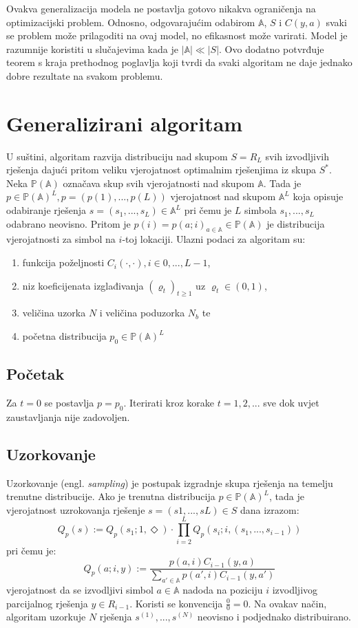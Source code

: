 \documentclass[times, utf8, zavrsni]{fer}
\begin{document}
Ovakva generalizacija modela ne postavlja gotovo nikakva ograničenja na optimizacijski problem. Odnosno, odgovarajućim odabirom
$\mathbb{A}$, $S$ i $C(y, a)$ svaki se problem može prilagoditi na ovaj model, no efikasnost može varirati. Model je razumnije koristiti u slučajevima kada je $|\mathbb{A}| \ll |S|$. Ovo dodatno potvrđuje teorem s kraja prethodnog poglavlja koji tvrdi da svaki algoritam ne daje jednako dobre rezultate na svakom problemu.



\section{Generalizirani algoritam}
U suštini, algoritam razvija distribuciju nad skupom $S=R_L$ svih izvodljivih rješenja dajući pritom veliku vjerojatnost optimalnim rješenjima iz skupa $S^*$.
Neka $\mathbb{P}(\mathbb{A})$ označava skup svih vjerojatnosti nad skupom $\mathbb{A}$. Tada je $p \in \mathbb{P}(\mathbb{A})^L, p = (p(1), . . . , p(L))$ vjerojatnost nad skupom $\mathbb{A}^L$ koja opisuje odabiranje rješenja
$s = (s_1,...,s_L) \in \mathbb{A}^L$ pri čemu je $L$ simbola $s_1,...,s_L$ odabrano neovisno. Pritom je
$p(i) = p(a;i)_{a \in \mathbb{A}} \in \mathbb{P}(\mathbb{A})$ je distribucija vjerojatnosti za simbol na $i$-toj lokaciji.
Ulazni podaci za algoritam su:
\begin{enumerate}
  \item funkcija poželjnosti $C_i(\cdot, \cdot), i \in {0,..., L-1}$,
  \item niz koeficijenata izglađivanja $(\varrho_t)_{t \geq 1}$ uz $\varrho_t \in (0, 1)$,
  \item veličina uzorka $N$ i veličina poduzorka $N_b$ te
  \item početna distribucija $p_0 \in \mathbb{P}(\mathbb{A})^L$
\end{enumerate}

\subsection{Početak}
Za $t = 0$ se postavlja $p = p_0$. Iterirati kroz korake $t = 1, 2,...$ sve dok uvjet zaustavljanja nije zadovoljen.

\subsection{Uzorkovanje}
Uzorkovanje (engl. \textit{sampling}) je postupak izgradnje skupa rješenja na temelju trenutne distribucije.
Ako je trenutna distribucija $p \in \mathbb{P}(\mathbb{A})^L$, tada je vjerojatnost uzrokovanja rješenje $s = (s1,...,sL) \in S$ dana izrazom:
$$
Q_p(s) := Q_p(s_1; 1, \Diamond) \cdot \prod^L_{i=2} Q_p(s_i;i, (s_1,...,s_{i-1}))
$$
pri čemu je:
$$
Q_p(a;i, y) := \frac{p(a, i)C_{i-1}(y, a)}{\sum_{a' \in \mathbb{A}} p(a', i)C_{i-1}(y, a') }
$$
vjerojatnost da se izvodljivi simbol $a \in \mathbb{A}$ nadoda na poziciju $i$ izvodljivog parcijalnog rješenja $y \in R_{i-1}$. Koristi se konvencija $\frac{0}{0} = 0$.
Na ovakav način, algoritam uzorkuje $N$ rješenja $s^{(1)},...,s^{(N)}$ neovisno i podjednako distribuirano.
\end{document}
